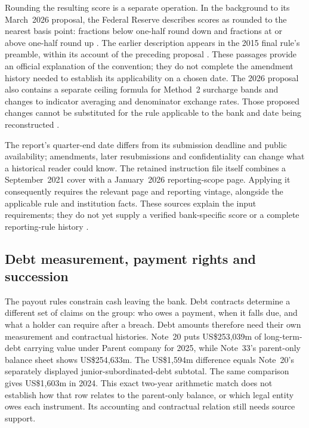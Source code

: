 Rounding the resulting score is a separate operation. In the background to
its March~2026 proposal, the Federal Reserve describes scores as rounded to
the nearest basis point: fractions below one-half round down and fractions
at or above one-half round up
\citep[p.~14909, n.~9]{fedgsibproposal2026}.
The earlier description appears in the 2015 final rule's preamble, within
its account of the preceding proposal
\citep[p.~49084, n.~22]{fedgsibfinal2015}.
These passages provide an official explanation of the convention; they do
not complete the amendment history needed to establish its applicability
on a chosen date. The 2026 proposal also contains a separate ceiling formula
for Method~2 surcharge bands and changes to indicator averaging and
denominator exchange rates. Those proposed changes cannot be substituted
for the rule applicable to the bank and date being reconstructed
\citep[pp.~14917--14922]{fedgsibproposal2026}.

\begin{samepage}
The report's quarter-end date differs from its submission deadline and public
availability; amendments, later resubmissions and confidentiality can change
what a historical reader could know. The retained instruction file itself
combines a September~2021 cover with a January~2026 reporting-scope page.
Applying it consequently requires the relevant page and reporting vintage,
alongside the applicable rule and institution facts. These sources explain
the input requirements; they do not yet supply a verified bank-specific score
or a complete reporting-rule history
\citep[cover and GEN-1--5; physical pp.~1, 5--9]{fry15instructionsretained2026}.
\par
\end{samepage}


\subsection{Debt measurement, payment rights and succession}
\label{sec:bank-debt-rights}

The payout rules constrain cash leaving the bank. Debt contracts determine
a different set of claims on the group: who owes a payment, when it falls
due, and what a holder can require after a breach. Debt amounts therefore
need their own measurement and contractual histories. Note~20 puts US\$253{,}039m of
long-term-debt carrying value under Parent company for 2025, while Note~33's
parent-only balance sheet shows US\$254{,}633m. The US\$1{,}594m difference
equals Note~20's separately displayed junior-subordinated-debt subtotal. The
same comparison gives US\$1{,}603m in 2024. This exact two-year arithmetic
match does not establish how that row relates to the parent-only balance,
or which legal entity owes each instrument. Its accounting and
contractual relation still needs source support.


